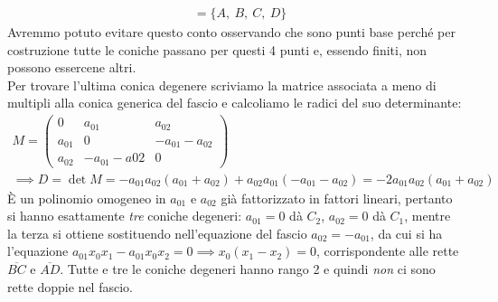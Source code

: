 \begin{demonstration}
\begin{equation*}
\begin{array}{ll}
				&=\{A,\ B,\ C,\ D\}
			\end{array}
		\end{equation*}
	Avremmo potuto evitare questo conto osservando che sono punti base perché per costruzione tutte le coniche passano per questi 4 punti e, essendo finiti, non possono essercene altri.\\
	Per trovare l'ultima conica degenere scriviamo la matrice associata a meno di multipli alla conica generica del fascio e calcoliamo le radici del suo determinante:
		\begin{gather*}
			M=\begin{pmatrix}
				0 & a_{01} & a_{02} \\
				a_{01} & 0 & -a_{01}-a_{02}\\
				a_{02} & -a_{01}-a{02} & 0
			\end{pmatrix}\\
		\implies D=\det M= -a_{01}a_{02}(a_{01}+a_{02})+a_{02}a_{01}(-a_{01}-a_{02}) = -2a_{01}a_{02}(a_{01}+a_{02})
		\end{gather*}
	È un polinomio omogeneo in $a_{01}$ e $a_{02}$ già fattorizzato in fattori lineari, pertanto si hanno esattamente \textit{tre} coniche degeneri: $a_{01}=0$ dà $C_2$, $a_{02}=0$ dà $C_1$, mentre la terza si ottiene sostituendo nell'equazione del fascio $a_{02}=-a_{01}$, da cui si ha l'equazione $a_{01}x_0x_1-a_{01}x_0x_2=0\implies x_0(x_1-x_2)=0$, corrispondente alle rette $\overline{BC}$ e $\overline{AD}$. Tutte e tre le coniche degeneri hanno rango 2 e quindi \textit{non} ci sono rette doppie nel fascio.
\end{demonstration}

